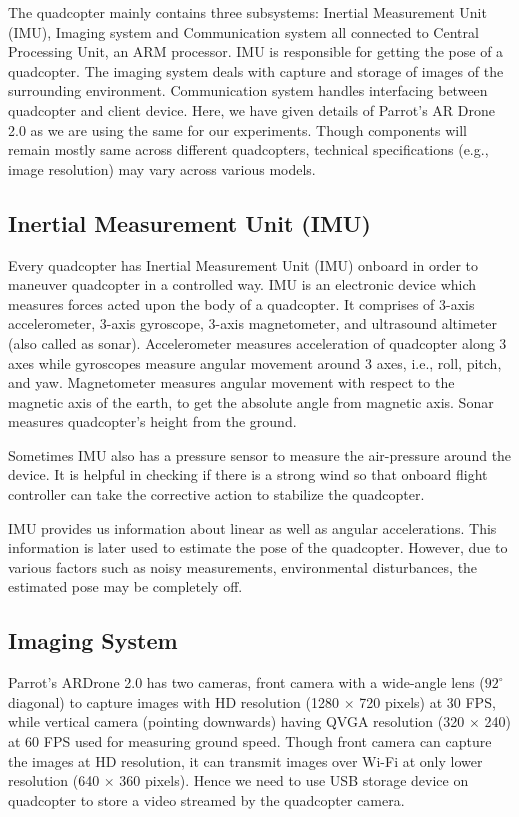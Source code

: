 The quadcopter mainly contains three subsystems: Inertial Measurement Unit (IMU),
Imaging system and Communication system all connected to Central Processing
Unit, an ARM processor. IMU is responsible for getting the pose of a quadcopter.
The imaging system deals with capture and storage of images of the surrounding
environment. Communication system handles interfacing between quadcopter and
client device. Here, we have given details of Parrot's AR Drone 2.0 as we are
using the same for our experiments. Though components will remain mostly same across
different quadcopters, technical specifications (e.g., image resolution) may
vary across various models.

\subsection{Inertial Measurement Unit (IMU)}
Every quadcopter has Inertial Measurement Unit (IMU) onboard in order to maneuver
quadcopter in a controlled way. IMU is an electronic device which measures forces
acted upon the body of a quadcopter. It comprises of 3-axis accelerometer, 3-axis
gyroscope, 3-axis magnetometer, and ultrasound altimeter (also called as sonar).
Accelerometer measures acceleration of quadcopter along 3 axes while gyroscopes
measure angular movement around 3 axes, i.e., roll, pitch, and yaw. Magnetometer
measures angular movement with respect to the magnetic axis of the earth, to get
the absolute angle from magnetic axis. Sonar measures quadcopter's
height from the ground.

Sometimes IMU also has a pressure sensor to measure the air-pressure around the
device. It is helpful in checking if there is a strong wind so that
onboard flight controller can take the corrective action to stabilize the
quadcopter. 

IMU provides us information about linear as well as angular accelerations. This
information is later used to estimate the pose of the quadcopter. However, due
to various factors such as noisy measurements, environmental disturbances, the
estimated pose may be completely off.
 
\subsection{Imaging System}
Parrot's ARDrone 2.0 has two cameras, front camera with a wide-angle lens
($92^{\circ}$ diagonal) to capture images with HD resolution (1280 $\times$ 720
pixels) at 30 FPS, while vertical camera (pointing downwards) having QVGA
resolution (320 $\times$ 240) at 60 FPS used for measuring ground speed.
Though front camera can capture the images at HD resolution, it can transmit
images over Wi-Fi at only  lower resolution (640 $\times$ 360 pixels). Hence we
need to use USB storage device on quadcopter to store a video streamed by the
quadcopter camera. 

